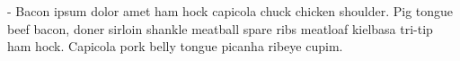 
 - Bacon ipsum dolor amet ham hock capicola chuck chicken shoulder. Pig tongue beef bacon,
doner sirloin shankle meatball spare ribs meatloaf kielbasa tri-tip ham hock. Capicola pork belly tongue
picanha ribeye cupim. 